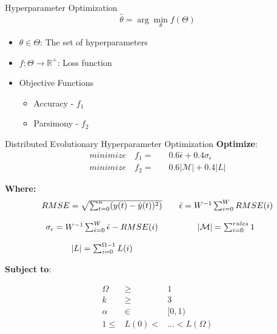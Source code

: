 \documentclass{beamer}
\begin{document}
\begin{frame}{Hyperparameter Optimization}
\linespread{2}
$$\hat{\theta} = \arg\min_\theta f(\Theta)$$
\begin{itemize}
    \item $\theta \in \Theta$:  The set of hyperparameters 
    \item $f: \Theta \rightarrow \mathbb{R}^+$: Loss function
    \item Objective Functions
    \begin{itemize}
        \item Accuracy - $f_1$
        \item Parsimony - $f_2$
    \end{itemize}
\end{itemize}
\end{frame}


\begin{frame}{Distributed Evolutionary Hyperparameter Optimization}
\scriptsize
\textbf{Optimize}:
$$
\begin{array}{cc}
    minimize \quad  f_1  = & \quad 0.6\bar{\epsilon} + 0.4\sigma_\epsilon \\
    minimize \quad  f_2  = & \quad 0.6|\mathcal{M}| + 0.4|L|  
\end{array}
$$

\textbf{Where:}
$$
\begin{array}{ccc}
RMSE = \sqrt{\sum_{t=0}^n (y(t) - \hat{y}(t))^2 )} & &
\bar{\epsilon}  =  W^{-1}\sum_{i=0}^W RMSE(i) \\ 
\\
\sigma_\epsilon  =  W^{-1}\sum_{i=0}^W \bar{\epsilon} - RMSE(i) & & |\mathcal{M}| = \sum_{i=0}^{rules} 1 \\ 
\\
|L| = \sum_{i=0}^{\Omega-1} L(i)  & &
\end{array}
$$

\textbf{Subject to}:

$$
\begin{array}{ccc}
\Omega &\geq & 1 \\
k &\geq & 3  \\
\alpha &\in & [0,1)  \\
1 \leq & L(0) < & ... < L(\Omega)  
\end{array}
$$
\end{frame}
\end{document}

